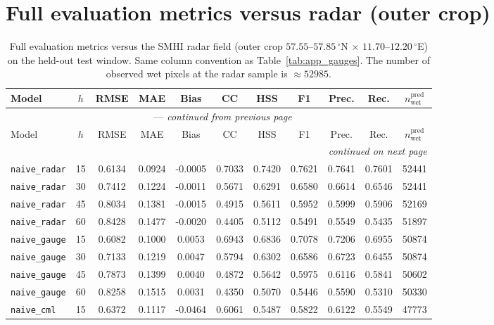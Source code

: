 \documentclass[12pt, a4paper]{article}
\begin{document}
\section{Full evaluation metrics versus radar (outer crop)}\label{app:radar_outer}

{\footnotesize
\begin{longtable}{p{4.0cm}cccccccccc}
\caption{Full evaluation metrics versus the SMHI radar field (outer crop $57.55$--$57.85\,^\circ$N $\times$ $11.70$--$12.20\,^\circ$E) on the held-out test window. Same column convention as Table~\ref{tab:app_gauges}. The number of observed wet pixels at the radar sample is $\approx 52985$.}\label{tab:app_radar_outer} \\
\toprule
Model & $h$ & RMSE & MAE & Bias & CC & HSS & F1 & Prec. & Rec. & $n_{\text{wet}}^{\text{pred}}$ \\
\midrule
\endfirsthead
\multicolumn{11}{c}{\tablename\ \thetable{} --- \textit{continued from previous page}} \\
\toprule
Model & $h$ & RMSE & MAE & Bias & CC & HSS & F1 & Prec. & Rec. & $n_{\text{wet}}^{\text{pred}}$ \\
\midrule
\endhead
\midrule
\multicolumn{11}{r}{\textit{continued on next page}} \\
\endfoot
\bottomrule
\endlastfoot
\texttt{naive\_radar} & 15 & 0.6134 & 0.0924 & -0.0005 & 0.7033 & 0.7420 & 0.7621 & 0.7641 & 0.7601 & 52441 \\
\texttt{naive\_radar} & 30 & 0.7412 & 0.1224 & -0.0011 & 0.5671 & 0.6291 & 0.6580 & 0.6614 & 0.6546 & 52441 \\
\texttt{naive\_radar} & 45 & 0.8034 & 0.1381 & -0.0015 & 0.4915 & 0.5611 & 0.5952 & 0.5999 & 0.5906 & 52169 \\
\texttt{naive\_radar} & 60 & 0.8428 & 0.1477 & -0.0020 & 0.4405 & 0.5112 & 0.5491 & 0.5549 & 0.5435 & 51897 \\
\addlinespace[1pt]
\texttt{naive\_gauge} & 15 & 0.6082 & 0.1000 & 0.0053 & 0.6943 & 0.6836 & 0.7078 & 0.7206 & 0.6955 & 50874 \\
\texttt{naive\_gauge} & 30 & 0.7133 & 0.1219 & 0.0047 & 0.5794 & 0.6302 & 0.6586 & 0.6723 & 0.6455 & 50874 \\
\texttt{naive\_gauge} & 45 & 0.7873 & 0.1399 & 0.0040 & 0.4872 & 0.5642 & 0.5975 & 0.6116 & 0.5841 & 50602 \\
\texttt{naive\_gauge} & 60 & 0.8258 & 0.1515 & 0.0031 & 0.4350 & 0.5070 & 0.5446 & 0.5590 & 0.5310 & 50330 \\
\addlinespace[1pt]
\texttt{naive\_cml} & 15 & 0.6372 & 0.1117 & -0.0464 & 0.6061 & 0.5487 & 0.5822 & 0.6122 & 0.5549 & 47773 \\

\end{longtable}}
\end{document}
